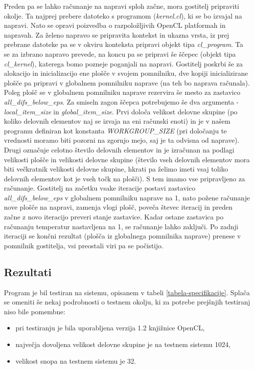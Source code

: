 \documentclass[a4paper,titlepage,11pt]{article}
\begin{document}
Preden pa se lahko računanje na napravi sploh začne, mora gostitelj pripraviti okolje. Ta najprej prebere datoteko s programom (\textit{kernel.cl}), ki se bo izvajal na napravi. Nato se opravi poizvedba o razpoložljivih OpenCL platformah in napravah. Za želeno napravo se pripravita kontekst in ukazna vrsta, iz prej prebrane datoteke pa se v okviru konteksta pripravi objekt tipa \textit{cl\_program}. Ta se za izbrano napravo prevede, na koncu pa se pripravi še ščepec (objekt tipa \textit{cl\_kernel}), katerega bomo pozneje poganjali na napravi. Gostitelj poskrbi še za alokacijo in inicializacijo ene plošče v svojem pomnilniku, dve kopiji inicializirane plošče pa pripravi v globalnem pomnilniku naprave (na teh bo naprava računala). Poleg plošč se v globalnem pomnilniku naprave rezervira še mesto za zastavico \textit{all\_difs\_below\_eps}. Za smiseln zagon ščepca potrebujemo še dva argumenta - \textit{local\_item\_size} in \textit{global\_item\_size}. Prvi določa velikost delovne skupine (po koliko delovnih elementov naj se izvaja na eni računski enoti) in je v našem programu definiran kot konstanta \textit{WORKGROUP\_SIZE} (pri določanju te vrednosti moramo biti pozorni na zgornjo mejo, saj je ta odvisna od naprave). Drugi označuje celotno število delovnih elementov in je izračunan na podlagi velikosti plošče in velikosti delovne skupine (število vseh delovnih elementov mora biti večkratnik velikosti delovne skupine, hkrati pa želimo imeti vsaj toliko delovnih elementov kot je vseh točk na plošči). S tem imamo vse pripravljeno za računanje. Gostitelj na začetku vsake iteracije postavi zastavico \textit{all\_difs\_below\_eps} v globalnem pomnilniku naprave na 1, nato požene računanje nove plošče na napravi, zamenja vlogi plošč, poveča števec iteracij in preden začne z novo iteracijo preveri stanje zastavice. Kadar ostane zastavica po računanju temperatur nastavljena na 1, se računanje lahko zaključi. Po zadnji iteraciji se končni rezultat (plošča iz globalnega pomnilnika naprave) prenese v pomnilnik gostitelja, vsi preostali viri pa se počistijo.

\subsection{Rezultati}

Program je bil testiran na sistemu, opisanem v tabeli \ref{tabela-specifikacije}. Splača se omeniti še nekaj podrobnosti o testnem okolju, ki za potrebe prejšnjih testiranj niso bile pomembne:
\begin{itemize}
\item pri testiranju je bila uporabljena verzija 1.2 knjižnice OpenCL,
\item največja dovoljena velikost delovne skupine je na testnem sistemu 1024,
\item velikost snopa na testnem sistemu je 32.
\end{itemize}
\end{document}
